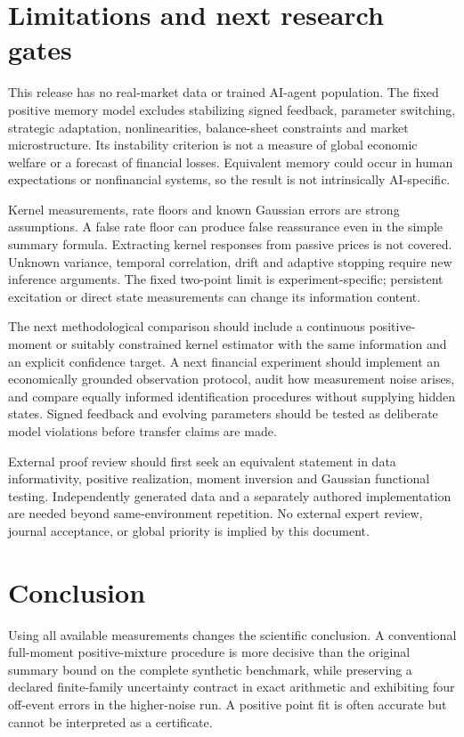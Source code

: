 \documentclass[11pt]{article}
\theoremstyle{remark}\newtheorem{remark}[proposition]{Remark}
\begin{document}
\section{Limitations and next research gates}
This release has no real-market data or trained AI-agent population. The fixed positive memory model excludes stabilizing signed feedback, parameter switching, strategic adaptation, nonlinearities, balance-sheet constraints and market microstructure. Its instability criterion is not a measure of global economic welfare or a forecast of financial losses. Equivalent memory could occur in human expectations or nonfinancial systems, so the result is not intrinsically AI-specific.

Kernel measurements, rate floors and known Gaussian errors are strong assumptions. A false rate floor can produce false reassurance even in the simple summary formula. Extracting kernel responses from passive prices is not covered. Unknown variance, temporal correlation, drift and adaptive stopping require new inference arguments. The fixed two-point limit is experiment-specific; persistent excitation or direct state measurements can change its information content.

The next methodological comparison should include a continuous positive-moment or suitably constrained kernel estimator with the same information and an explicit confidence target. A next financial experiment should implement an economically grounded observation protocol, audit how measurement noise arises, and compare equally informed identification procedures without supplying hidden states. Signed feedback and evolving parameters should be tested as deliberate model violations before transfer claims are made.

External proof review should first seek an equivalent statement in data informativity, positive realization, moment inversion and Gaussian functional testing. Independently generated data and a separately authored implementation are needed beyond same-environment repetition. No external expert review, journal acceptance, or global priority is implied by this document.

\section{Conclusion}
Using all available measurements changes the scientific conclusion. A conventional full-moment positive-mixture procedure is more decisive than the original summary bound on the complete synthetic benchmark, while preserving a declared finite-family uncertainty contract in exact arithmetic and exhibiting four off-event errors in the higher-noise run. A positive point fit is often accurate but cannot be interpreted as a certificate.
\end{document}
